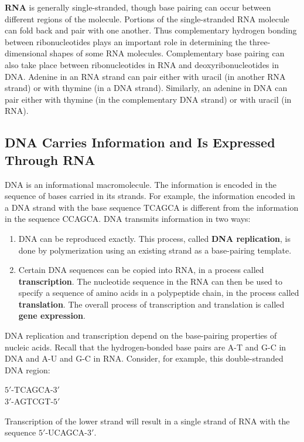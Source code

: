 \documentclass{report}
\begin{document}
\textbf{RNA} is generally single-stranded, though base pairing can occur between different regions of the molecule. Portions of the single-stranded RNA molecule can fold back and pair with one another. Thus complementary hydrogen bonding between ribonucleotides plays an important role in determining the three-dimensional shapes of some RNA molecules. Complementary base pairing can also take place between ribonucleotides in RNA and deoxyribonucleotides in DNA. Adenine in an RNA strand can pair either with uracil (in another RNA strand) or with thymine (in a DNA strand). Similarly, an adenine in DNA can pair either with thymine (in the complementary DNA strand) or with uracil (in RNA).

\subsection{DNA Carries Information and Is Expressed Through RNA}

DNA is an informational macromolecule. The information is encoded in the sequence of bases carried in its strands. For example, the information encoded in a DNA strand with the base sequence TCAGCA is different from the information in the sequence CCAGCA. DNA transmits information in two ways:

\begin{enumerate}
    \item DNA can be reproduced exactly. This process, called \textbf{DNA replication}, is done by polymerization using an existing strand as a base-pairing template.
    \item Certain DNA sequences can be copied into RNA, in a process called \textbf{transcription}. The nucleotide sequence in the RNA can then be used to specify a sequence of amino acids in a polypeptide chain, in the process called \textbf{translation}. The overall process of transcription and translation is called \textbf{gene expression}.
\end{enumerate}

DNA replication and transcription depend on the base-pairing properties of nucleic acids. Recall that the hydrogen-bonded base pairs are A-T and G-C in DNA and A-U and G-C in RNA. Consider, for example, this double-stranded DNA region:
\begin{center}
    \(5'\)-TCAGCA-\(3'\)\\
    \(3'\)-AGTCGT-\(5'\)
\end{center}
Transcription of the lower strand will result in a single strand of RNA with the sequence \(5'\)-UCAGCA-\(3'\).
\end{document}
